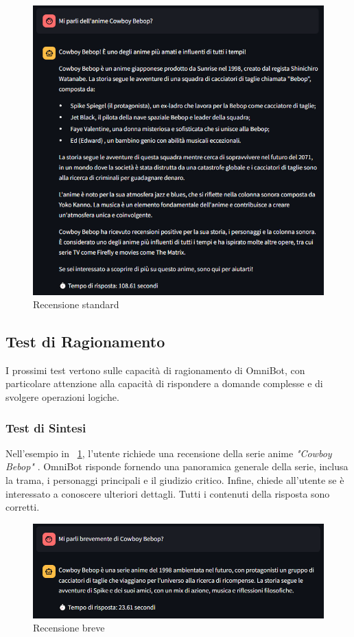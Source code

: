 \begin{figure}[!t]
    \centering
    \includegraphics[width=\textwidth]{Images/cap5/cowboy_bebop.PNG}
    \caption{Recensione standard}
    \label{fig:cowboy1}
\end{figure}

\subsection{Test di Ragionamento}
I prossimi test vertono sulle capacità di ragionamento di OmniBot, con particolare attenzione alla capacità di rispondere a domande complesse e di svolgere operazioni logiche.

\subsubsection{Test di Sintesi}
Nell'esempio in \figurename{~\ref{fig:cowboy1}}, l'utente richiede una recensione della serie anime \textit{"Cowboy Bebop"} \cite{cowboy}. OmniBot risponde fornendo una panoramica generale della serie, inclusa la trama, i personaggi principali e il giudizio critico. Infine, chiede all'utente se è interessato a conoscere ulteriori dettagli. Tutti i contenuti della risposta sono corretti.

\begin{figure}[!t]
    \centering
    \includegraphics[width=\textwidth]{Images/cap5/cowboy_bebop_breve.PNG}
    \caption{Recensione breve}
    \label{fig:cowboy2}
\end{figure}

